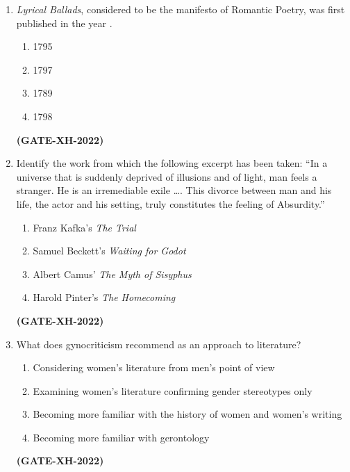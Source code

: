 \documentclass[journal]{IEEEtran}
\begin{document}
\begin{enumerate}
\item \textit{Lyrical Ballads}, considered to be the manifesto of Romantic Poetry, was first published in the year \underline{\hspace{2cm}}.
\begin{multicols}{4}
\begin{enumerate}
\item 1795
\item 1797
\item 1789
\item 1798
\end{enumerate}
\end{multicols}
\hfill\textbf{(GATE-XH-2022)}

\item Identify the work from which the following excerpt has been taken:  
``In a universe that is suddenly deprived of illusions and of light, man feels a stranger. He is an irremediable exile …. This divorce between man and his life, the actor and his setting, truly constitutes the feeling of Absurdity.''
\begin{multicols}{2}
\begin{enumerate}
\item Franz Kafka’s \textit{The Trial}
\item Samuel Beckett’s \textit{Waiting for Godot}
\item Albert Camus’ \textit{The Myth of Sisyphus}
\item Harold Pinter’s \textit{The Homecoming}
\end{enumerate}
\end{multicols}
\hfill\textbf{(GATE-XH-2022)}

\item What does gynocriticism recommend as an approach to literature?
\begin{enumerate}
\item Considering women’s literature from men’s point of view
\item Examining women’s literature confirming gender stereotypes only
\item Becoming more familiar with the history of women and women’s writing
\item Becoming more familiar with gerontology
\end{enumerate}
\hfill\textbf{(GATE-XH-2022)}


\end{enumerate}
\end{document}
